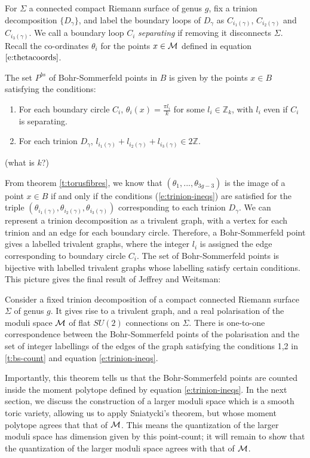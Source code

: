 	For $\Sigma$ a connected compact Riemann surface of genus $g$, fix a trinion decomposition $\{D_\gamma\}$, and label the boundary loops of $D_\gamma$ as $C_{i_1(\gamma)}$, $C_{i_2(\gamma)}$ and $C_{i_3(\gamma)}$. We call a boundary loop $C_i$ \emph{separating} if removing it disconnects $\Sigma$. Recall the co-ordinates $\theta_i$ for the points $x\in \mathcal{M}$ defined in equation $\ref{e:thetacoords}$. 
	\begin{theorem}[J\&W Thm 8.1]
		\label{t:bs-count}
		The set $P^{bs}$ of Bohr-Sommerfeld points in $B$ is given by the points $x\in B$ satisfying the conditions:
		\begin{enumerate}
			\item For each boundary circle $C_i$, $\theta_i(x) = \frac{\pi l_i}{k}$ for some $l_i \in \mathbb{Z}_k$, with $l_i$ even if $C_i$ is separating.
			\item For each trinion $D_\gamma$, $l_{i_1(\gamma)} + l_{i_2(\gamma)} + l_{i_3(\gamma)} \in 2\mathbb{Z}$.
		\end{enumerate}
	(what is $k$?)
	\end{theorem}
	From theorem \ref{t:torusfibres}, we know that $(\theta_1,...,\theta_{3g-3})$ is the image of a point $x\in B$ if and only if the conditions (\ref{e:trinion-ineqs}) are satisfied for the triple $(\theta_{i_1(\gamma)}, \theta_{i_2(\gamma)}, \theta_{i_3(\gamma)})$ corresponding to each trinion $D_\gamma$. We can represent a trinion decomposition as a trivalent graph, with a vertex for each trinion and an edge for each boundary circle. Therefore, a Bohr-Sommerfeld point gives a labelled trivalent graphs, where the integer $l_i$ is assigned the edge corresponding to boundary circle $C_i$. The set of Bohr-Sommerfeld points is bijective with labelled trivalent graphs whose labelling satisfy certain conditions. This picture gives the final result of Jeffrey and Weitsman:
	\begin{theorem}[J\& W Thm 8.3]
		Consider a fixed trinion decomposition of a compact connected Riemann surface $\Sigma$ of genus $g$. It gives rise to a trivalent graph, and a real polarisation of the moduli space $\mathcal{M}$ of flat $SU(2)$ connections on $\Sigma$. There is one-to-one correspondence between the Bohr-Sommerfeld points of the polarisation and the set of integer labellings of the edges of the graph satisfying the conditions 1,2 in \ref{t:bs-count} and equation \ref{e:trinion-ineqs}.
	\end{theorem}
	Importantly, this theorem tells us that the Bohr-Sommerfeld points are counted inside the moment polytope defined by equation \ref{e:trinion-ineqs}. In the next section, we discuss the construction of a larger moduli space which is a smooth toric variety, allowing us to apply Sniatycki's theorem, but whose moment polytope agrees that that of $\mathcal{M}$. This means the quantization of the larger moduli space has dimension given by this point-count; it will remain to show that the quantization of the larger moduli space agrees with that of $\mathcal{M}$. 
	
	